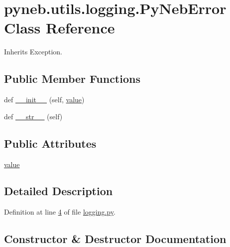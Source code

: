 \hypertarget{classpyneb_1_1utils_1_1logging_1_1_py_neb_error}{}\section{pyneb.\+utils.\+logging.\+Py\+Neb\+Error Class Reference}
\label{classpyneb_1_1utils_1_1logging_1_1_py_neb_error}


Inherits Exception.

\subsection*{Public Member Functions}
\begin{DoxyCompactItemize}
\item 
def \hyperlink{classpyneb_1_1utils_1_1logging_1_1_py_neb_error_a7b1aefe3380cb0c4e0bc1e964f9f326f}{\+\_\+\+\_\+init\+\_\+\+\_\+} (self, \hyperlink{classpyneb_1_1utils_1_1logging_1_1_py_neb_error_aec64ebee7cc44f3c40b15959cfeb2efb}{value})
\item 
def \hyperlink{classpyneb_1_1utils_1_1logging_1_1_py_neb_error_a5679076c6188021f71aeffa2caee4fd3}{\+\_\+\+\_\+str\+\_\+\+\_\+} (self)
\end{DoxyCompactItemize}
\subsection*{Public Attributes}
\begin{DoxyCompactItemize}
\item 
\hyperlink{classpyneb_1_1utils_1_1logging_1_1_py_neb_error_aec64ebee7cc44f3c40b15959cfeb2efb}{value}
\end{DoxyCompactItemize}


\subsection{Detailed Description}


Definition at line \hyperlink{logging_8py_source_l00004}{4} of file \hyperlink{logging_8py_source}{logging.\+py}.



\subsection{Constructor \& Destructor Documentation}
\hypertarget{classpyneb_1_1utils_1_1logging_1_1_py_neb_error_a7b1aefe3380cb0c4e0bc1e964f9f326f}{}
